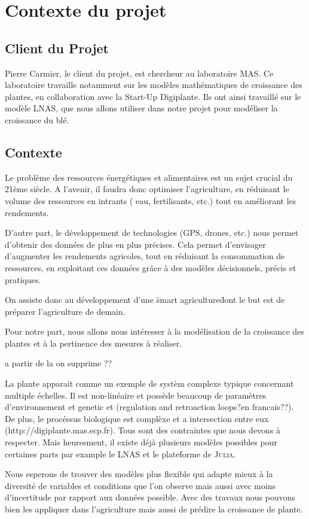 \section{Contexte du projet}

\subsection{Client du Projet}
Pierre Carmier, le client du projet, est chercheur au laboratoire MAS. Ce laboratoire travaille notamment sur les modèles mathématiques de croissance des plantes, en collaboration avec la Start-Up Digiplante. Ils ont ainsi travaillé sur le modèle LNAS, que nous allons utiliser dans notre projet pour modéliser la croissance du blé.
\subsection{Contexte}
Le problème des ressources énergétiques et alimentaires est un sujet crucial du  21ème siècle.
A l'avenir, il faudra donc optimiser l'agriculture, en réduisant le volume des ressources en intrants ( eau, fertilisants, etc.) tout en améliorant les rendements.

D'autre part, le développement de technologies (GPS, drones, etc.) nous permet d'obtenir des données de plus en plus précises. 
Cela permet d'envisager d'augmenter les rendements agricoles, tout en réduisant la consommation de ressources, en exploitant ces données grâce à des modèles décisionnels, précis et pratiques. 

On assiste donc au développement d'une \"smart agriculture\" dont le but est de préparer
l'agriculture de demain.

Pour notre part, nous allons nous intéresser à la modélisation de la croissance des plantes et à la pertinence des mesures à réaliser.


a partir de la on supprime ??


La plante apparait comme un exemple de systèm complexe typique concernant 
multiple échelles. Il est non-linéaire et possède beaucoup de paramètres
d'environnement et genetic et (regulation and retroaction loops?en francais??).
De plus,  le procéssus biologique est complèxe et a intersection entre eux
(http://digiplante.mas.ecp.fr). Tous sont des contraintes que 
nous devons à respecter. Mais heuresment, 
il existe déjà plusieurs modèles possibles pour certaines parts 
par example le LNAS et le plateforme de \textsc{Julia}.

Nous esperons de trouver des modèles plus flexible qui adapte mieux à la diversité
de variables et conditions que l'on observe mais aussi avec moins d'incertitude 
par rapport aux données possible. Avec des travaux 
nous pouvons bien les appliquer dans l'agriculture 
mais aussi de prédire la croissance de plante.

